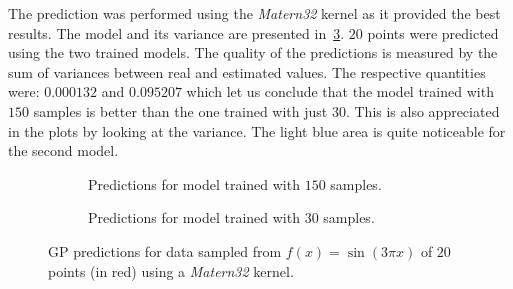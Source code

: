 The prediction was performed using the \emph{Matern32} kernel as it provided the
best results. The model and its variance are presented
in~\cref{fig_gppredftest}. $20$ points were predicted using the two trained
models. The quality of the predictions is measured by the sum of variances
between real and estimated values. The respective quantities were: $0.000132$
and $0.095207$ which let us conclude that the model trained with $150$ samples
is better than the one trained with just $30$. This is also appreciated in the
plots by looking at the variance. The light blue area is quite noticeable for
the second model.

\begin{figure}
  \begin{subfigure}[h]{.5\linewidth}
    
    \caption{Predictions for model trained with $150$ samples.}
    \label{fig_predftest}
  \end{subfigure}
  \begin{subfigure}[h]{.5\linewidth}
    
    \caption{Predictions for model trained with $30$ samples.}
    \label{fig_predftest2}
  \end{subfigure}
  \caption{GP predictions for data sampled from $f(x) = \sin(3\pi x)$ of $20$
   points (in red) using a \emph{Matern32} kernel.}
  \label{fig_gppredftest}
\end{figure}
